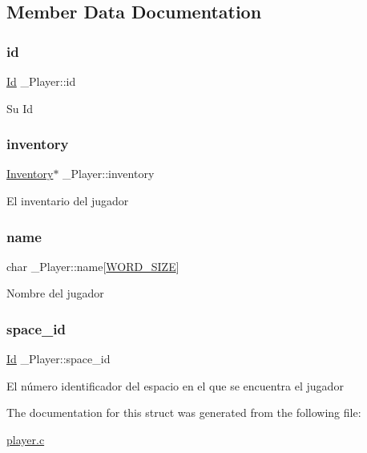 \subsection{Member Data Documentation}
\mbox{\label{struct__Player_a60d635cd063816a9c1bd873f4868bb90}} 
\subsubsection{\texorpdfstring{id}{id}}
{\footnotesize\ttfamily \hyperlink{types_8h_a845e604fb28f7e3d97549da3448149d3}{Id} \+\_\+\+Player\+::id}

Su Id \mbox{\label{struct__Player_a5e02924cb82ca61f74ba414d190aa29b}} 
\subsubsection{\texorpdfstring{inventory}{inventory}}
{\footnotesize\ttfamily \hyperlink{inventory_8h_a2253bf64ac4ce6a9c1d6f39c0b0d32a3}{Inventory}$\ast$ \+\_\+\+Player\+::inventory}

El inventario del jugador \mbox{\label{struct__Player_adda99df91c28eb58d392f2b43fc6898f}} 
\subsubsection{\texorpdfstring{name}{name}}
{\footnotesize\ttfamily char \+\_\+\+Player\+::name\mbox{[}\hyperlink{types_8h_a92ed8507d1cd2331ad09275c5c4c1c89}{W\+O\+R\+D\+\_\+\+S\+I\+ZE}\mbox{]}}

Nombre del jugador \mbox{\label{struct__Player_aed09e7001b0005d679224be84e98d2a8}} 
\subsubsection{\texorpdfstring{space\+\_\+id}{space\_id}}
{\footnotesize\ttfamily \hyperlink{types_8h_a845e604fb28f7e3d97549da3448149d3}{Id} \+\_\+\+Player\+::space\+\_\+id}

El número identificador del espacio en el que se encuentra el jugador 

The documentation for this struct was generated from the following file\+:\begin{DoxyCompactItemize}
\item 
\hyperlink{player_8c}{player.\+c}\end{DoxyCompactItemize}
